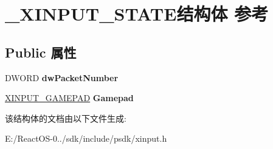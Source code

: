 \hypertarget{struct___x_i_n_p_u_t___s_t_a_t_e}{}\section{\+\_\+\+X\+I\+N\+P\+U\+T\+\_\+\+S\+T\+A\+T\+E结构体 参考}
\label{struct___x_i_n_p_u_t___s_t_a_t_e}
\subsection*{Public 属性}
\begin{DoxyCompactItemize}
\item 
\mbox{\label{struct___x_i_n_p_u_t___s_t_a_t_e_ab2439a9094e92032ce57a3692e4c2e5e}} 
D\+W\+O\+RD {\bfseries dw\+Packet\+Number}
\item 
\mbox{\label{struct___x_i_n_p_u_t___s_t_a_t_e_a5eee32c04cc4419aa6ae2d24a53b56fa}} 
\hyperlink{struct___x_i_n_p_u_t___g_a_m_e_p_a_d}{X\+I\+N\+P\+U\+T\+\_\+\+G\+A\+M\+E\+P\+AD} {\bfseries Gamepad}
\end{DoxyCompactItemize}


该结构体的文档由以下文件生成\+:\begin{DoxyCompactItemize}
\item 
E\+:/\+React\+O\+S-\/0../sdk/include/psdk/xinput.\+h\end{DoxyCompactItemize}
